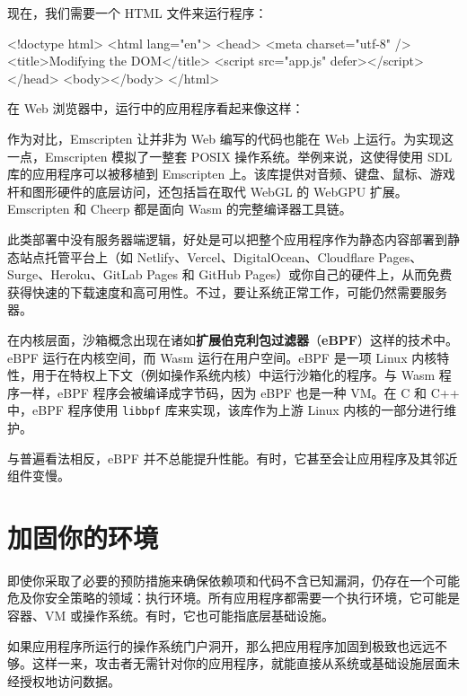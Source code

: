 现在，我们需要一个 HTML 文件来运行程序：

\begin{codebox}[text]
<!doctype html>
<html lang="en">
<head>
    <meta charset="utf-8" />
    <title>Modifying the DOM</title>
    <script src="app.js" defer></script>
</head>
<body></body>
</html>
\end{codebox}

在 Web 浏览器中，运行中的应用程序看起来像这样：


\label{idx:1140}
作为对比，Emscripten 让并非为 Web 编写的代码也能在 Web 上运行。为实现这一点，Emscripten 模拟了一整套 POSIX 操作系统。举例来说，这使得使用 SDL 库的应用程序可以被移植到 Emscripten 上。该库提供对音频、键盘、鼠标、游戏杆和图形硬件的底层访问，还包括旨在取代 WebGL 的 WebGPU 扩展。Emscripten 和 Cheerp 都是面向 Wasm 的完整编译器工具链。

\label{idx:1141}
此类部署中没有服务器端逻辑，好处是可以把整个应用程序作为静态内容部署到静态站点托管平台上（如 Netlify、Vercel、DigitalOcean、Cloudflare Pages、Surge、Heroku、GitLab Pages 和 GitHub Pages）或你自己的硬件上，从而免费获得快速的下载速度和高可用性。不过，要让系统正常工作，可能仍然需要服务器。

\label{idx:1142}
\label{idx:1143}
在内核层面，沙箱概念出现在诸如\textbf{扩展伯克利包过滤器}（\textbf{eBPF}）这样的技术中。eBPF 运行在内核空间，而 Wasm 运行在用户空间。eBPF 是一项 Linux 内核特性，用于在特权上下文（例如操作系统内核）中运行沙箱化的程序。与 Wasm 程序一样，eBPF 程序会被编译成字节码，因为 eBPF 也是一种 VM。在 C 和 C++ 中，eBPF 程序使用 \texttt{libbpf} 库来实现，该库作为上游 Linux 内核的一部分进行维护。

与普遍看法相反，eBPF 并不总能提升性能。有时，它甚至会让应用程序及其邻近组件变慢。

\section{加固你的环境}

\label{idx:1144}
即使你采取了必要的预防措施来确保依赖项和代码不含已知漏洞，仍存在一个可能危及你安全策略的领域：执行环境。所有应用程序都需要一个执行环境，它可能是容器、VM 或操作系统。有时，它也可能指底层基础设施。

如果应用程序所运行的操作系统门户洞开，那么把应用程序加固到极致也远远不够。这样一来，攻击者无需针对你的应用程序，就能直接从系统或基础设施层面未经授权地访问数据。

